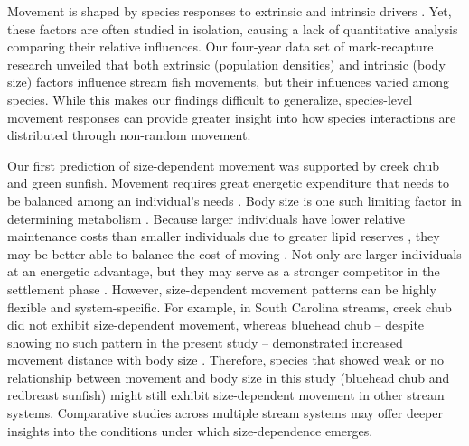 \documentclass[11pt, class=article, crop=false]{standalone}
\begin{document}
Movement is shaped by species responses to extrinsic and intrinsic drivers \citep{clobertDispersalEcologyEvolution2012}. Yet, these factors are often studied in isolation, causing a lack of quantitative analysis comparing their relative influences. Our four-year data set of mark-recapture research unveiled that both extrinsic (population densities) and intrinsic (body size) factors influence stream fish movements, but their influences varied among species. While this makes our findings difficult to generalize, species-level movement responses can provide greater insight into how species interactions are distributed through non-random movement. 

Our first prediction of size-dependent movement was supported by creek chub and green sunfish. Movement requires great energetic expenditure that needs to be balanced among an individual’s needs \citep{boisclairImportanceActivityBioenergetics1989, joblingBioenergeticsFeedIntake1993, cookeMovementEcologyFishes2022}. Body size is one such limiting factor in determining metabolism \citep{beamish2SwimmingCapacity1978, rubio-graciaSizerelatedEffectsInfluence2020}. Because larger individuals have lower relative maintenance costs than smaller individuals due to greater lipid reserves \citep{brownSizeMattersTest2004, krauseRefugeUseFish1998, kannoBodyConditionMetrics2023}, they may be better able to balance the cost of moving \citep{schlagelMovementmediatedCommunityAssembly2020}. Not only are larger individuals at an energetic advantage, but they may serve as a stronger competitor in the settlement phase \citep{rasmussenIndividualMovementStream2017}. 
However, size-dependent movement patterns can be highly flexible and system-specific. For example, in South Carolina streams, creek chub did not exhibit size-dependent movement, whereas bluehead chub -- despite showing no such pattern in the present study -- demonstrated increased movement distance with body size \citep{teruiNonrandomDispersalSympatric2021}. Therefore, species that showed weak or no relationship between movement and body size in this study (bluehead chub and redbreast sunfish) might still exhibit size-dependent movement in other stream systems.
Comparative studies across multiple stream systems may offer deeper insights into the conditions under which size-dependence emerges.
\end{document}
